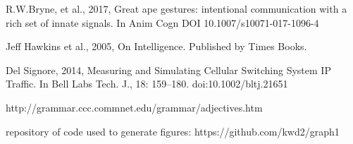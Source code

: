 \documentclass{clv3}
\begin{document}
\begin{unenumerate}
\item R.W.Bryne, et al., 2017,  Great ape gestures: intentional communication with a rich set of innate signals. In  Anim Cogn DOI 10.1007/s10071-017-1096-4



\item  Jeff Hawkins et al., 2005, On Intelligence. Published by Times Books. 

\item Del Signore, 2014,  Measuring and Simulating Cellular Switching System IP Traffic.  In  Bell Labs Tech. J., 18: 159–180. doi:10.1002/bltj.21651 

\item  http://grammar.ccc.commnet.edu/grammar/adjectives.htm

\item  repository of code used to generate figures: https://github.com/kwd2/graph1  

\end{unenumerate}
\end{document}
